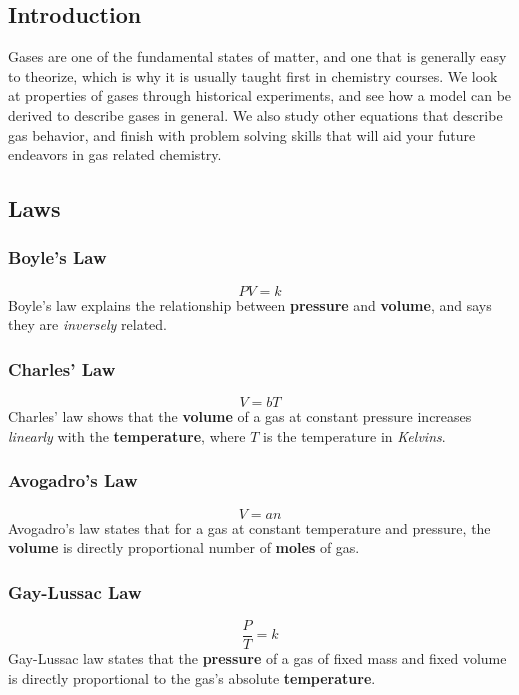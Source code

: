 \subsection{Introduction}
Gases are one of the fundamental states of matter, and one that is generally easy to theorize, which is why it is usually taught first in chemistry courses. We look at properties of gases through historical experiments, and see how a model can be derived to describe gases in general. We also study other equations that describe gas behavior, and finish with problem solving skills that will aid your future endeavors in gas related chemistry.

\subsection{Laws}
\subsubsection{Boyle's Law}
\begin{equation}
    \boxed{PV = k}
\end{equation}
Boyle's law explains the relationship between \textbf{pressure} and \textbf{volume}, and says they are \textit{inversely} related.
\subsubsection{Charles' Law}
\begin{equation}
    \boxed{V = bT}
\end{equation}
Charles' law shows that the \textbf{volume} of a gas at constant pressure increases \textit{linearly} with the \textbf{temperature}, where $T$ is the temperature in \textit{Kelvins}.
\subsubsection{Avogadro's Law}
\begin{equation}
    \boxed{V = an}
\end{equation}
Avogadro's law states that for a gas at constant temperature and pressure, the \textbf{volume} is directly proportional  number of \textbf{moles} of gas.
\subsubsection{Gay-Lussac Law}
\begin{equation}
    \boxed{\frac{P}{T} = k}
\end{equation}
Gay-Lussac law states that the \textbf{pressure} of a gas of fixed mass and fixed volume is directly proportional to the gas's absolute \textbf{temperature}.

